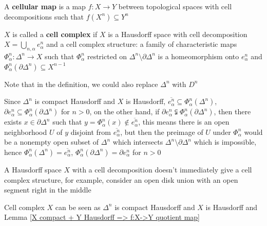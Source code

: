 \documentclass[main]{subfiles}
\begin{document}
\begin{definition}
A \textbf{cellular map} is a map $f:X\to Y$ between topological spaces with cell decompositions such that $f(X^n)\subseteq Y^n$
\end{definition}

\begin{definition}
$X$ is called a \textbf{cell complex} if $X$ is a Hausdorff space with cell decomposition $\displaystyle X=\bigcup_{n,\alpha}e^n_\alpha$ and a cell complex structure: a family of characteristic maps $\Phi^n_\alpha:\Delta^n\to X$ such that $\Phi^n_\alpha$ restricted on $\Delta^n\setminus\partial\Delta^n$ is a homeomorphism onto $e^n_\alpha$ and $\Phi^n_\alpha\left(\partial\Delta^n\right)\subseteq X^{n-1}$ \par
Note that in the definition, we could also replace $\Delta^n$ with $D^n$
\end{definition}

\begin{remark}
Since $\Delta^n$ is compact Hausdorff and $X$ is Hausdorff, $\overline{e^n_\alpha}\subseteq \Phi^n_\alpha\left(\Delta^n\right)$, $\partial e^n_\alpha\subseteq \Phi^n_\alpha\left(\partial\Delta^n\right)$ for $n>0$, on the other hand, if $\partial e^n_\alpha\subsetneqq \Phi^n_\alpha\left(\partial\Delta^n\right)$, then there exists $x\in\partial\Delta^n$ such that $y=\Phi^n_\alpha(x)\notin\overline{e^n_\alpha}$, this means there is an open neighborhood $U$ of $y$ disjoint from $\overline{e^n_\alpha}$, but then the preimage of $U$ under $\Phi^n_\alpha$ would be a nonempty open subset of $\Delta^n$ which intersects $\Delta^n\setminus\partial\Delta^n$ which is impossible, hence  $\Phi^n_\alpha\left(\Delta^n\right)=\overline{e^n_\alpha}$, $\Phi^n_\alpha\left(\partial\Delta^n\right)=\partial e^n_\alpha$ for $n>0$ \par
A Hausdorff space $X$ with a cell decomposition doesn't immediately give a cell complex structure, for example, consider an open disk union with an open segment right in the middle
\begin{center}
\end{center}
Cell complex $X$ can be seen as
$\Delta^n$ is compact Hausdorff and $X$ is Hausdorff and Lemma \ref{X compact + Y Hausdorff => f:X->Y quotient map}
\end{remark}
\end{document}
